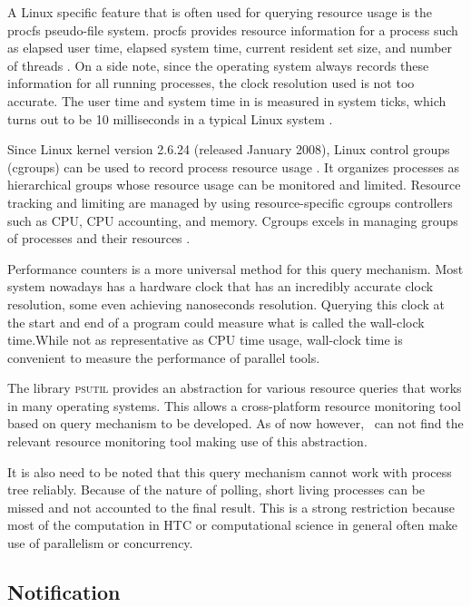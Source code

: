 A Linux specific feature that is often used for querying resource usage is the procfs pseudo-file system.
procfs provides resource information for a process such as elapsed user time, elapsed system time, current resident set size, and number of threads \citep{manpages}.
On a side note, since the operating system always records these information for all running processes, the clock resolution used is not too accurate.
The user time and system time in  is measured in system ticks, which turns out to be 10 milliseconds in a typical Linux system \citep{manpages}.

Since Linux kernel version 2.6.24 (released January 2008), Linux control groups (cgroups) can be used to record process resource usage \citep[cgroups(7)]{manpages}.
It organizes processes as hierarchical groups whose resource usage can be monitored and limited.
Resource tracking and limiting are managed by using resource-specific cgroups controllers such as CPU, CPU accounting, and memory.
Cgroups excels in managing groups of processes and their resources \citep{beyerBenchmarkingResourceMeasurement2015}.



Performance counters is a more universal method for this query mechanism.
Most system nowadays has a hardware clock that has an incredibly accurate clock resolution, some even achieving nanoseconds resolution.
Querying this clock at the start and end of a program could measure what is called the wall-clock time.While not as representative as CPU time usage, wall-clock time is convenient to measure the performance of parallel tools.

The library \textsc{psutil} \citep{rodolaCrossplatformLibProcess2019} provides an abstraction for various resource queries that works in many operating systems.
This allows a cross-platform resource monitoring tool based on query mechanism to be developed.
As of now however, \first~can not find the relevant resource monitoring tool making use of this abstraction.

It is also need to be noted that this query mechanism cannot work with process tree reliably.
Because of the nature of polling, short living processes can be missed and not accounted to the final result.
This is a strong restriction because most of the computation in HTC or computational science in general often make use of parallelism or concurrency.


\subsection{Notification}

